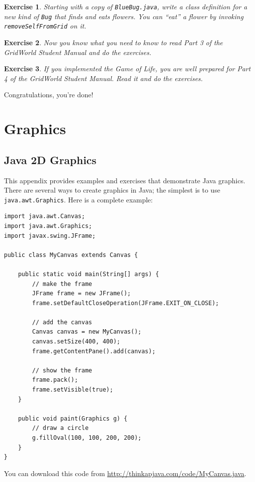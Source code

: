 \documentclass[12pt]{book}
\theoremstyle{exercise}
\newtheorem{exercise}{Exercise}[chapter]
\begin{document}
\begin{exercise}
Starting with a copy of {\tt BlueBug.java}, write a class definition
for a new kind of {\tt Bug} that finds and eats flowers.  You can
``eat'' a flower by invoking {\tt removeSelfFromGrid} on it.
\end{exercise}

\begin{exercise}
Now you know what you need to know to read Part 3 of the
GridWorld Student Manual and do the exercises.
\end{exercise}

\begin{exercise}
If you implemented the Game of Life, you are well prepared for
Part 4 of the GridWorld Student Manual.  Read it and do the exercises.
\end{exercise}


Congratulations, you're done!


\appendix

\chapter{Graphics}
\label{graphics}

\section{Java 2D Graphics}

This appendix provides examples and exercises that demonstrate Java
graphics.  There are several ways to create graphics in Java; the
simplest is to use {\tt java.awt.Graphics}.
Here is a complete example:

\begin{lstlisting}
import java.awt.Canvas;
import java.awt.Graphics;
import javax.swing.JFrame;

public class MyCanvas extends Canvas {

    public static void main(String[] args) {
        // make the frame
        JFrame frame = new JFrame();
        frame.setDefaultCloseOperation(JFrame.EXIT_ON_CLOSE);

        // add the canvas
        Canvas canvas = new MyCanvas();
        canvas.setSize(400, 400);
        frame.getContentPane().add(canvas);

        // show the frame
        frame.pack();
        frame.setVisible(true);
    }

    public void paint(Graphics g) {
        // draw a circle
        g.fillOval(100, 100, 200, 200);
    }
}
\end{lstlisting}
%
You can download this code from
\url{http://thinkapjava.com/code/MyCanvas.java}.
\end{document}
